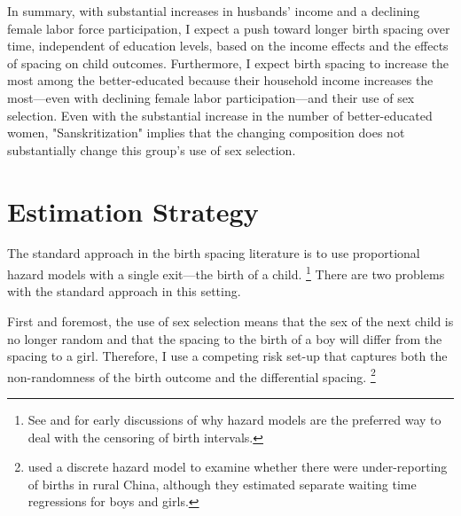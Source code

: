 \documentclass[12pt,letterpaper]{article}
\begin{document}
In summary, with substantial increases in husbands' income and a declining female labor 
force participation, I expect a push toward longer birth spacing over time, independent
of education levels, based on the income effects and the effects of spacing
on child outcomes.
Furthermore, I expect birth spacing to increase the most among the better-educated 
because their household income increases the most---even with declining female labor 
participation---and their use of sex selection.
Even with the substantial increase in the number of better-educated women, 
"Sanskritization" implies that the changing composition does not substantially change 
this group's use of sex selection.



\section{Estimation Strategy\label{sec:strategy}}


The standard approach in the birth spacing literature is to use proportional hazard
models with a single exit---the birth of a child.%
\footnote{
See \citet{Sheps1970} and \citet{Newman1984} for early discussions of why 
hazard models are the preferred way to deal with the censoring of birth
intervals.
}
There are two problems with the standard approach in this setting.

First and foremost, the use of sex selection means that the sex of the next child is 
no longer random and that the spacing to the birth of a boy will differ from the 
spacing to a girl. 
Therefore, I use a competing risk set-up that captures both the non-randomness of 
the birth outcome and the differential spacing.%
\footnote{
\cite{Merli2000} used a discrete hazard model to examine whether 
there were under-reporting of births in rural China, although they 
estimated separate waiting time regressions for boys and girls.
}
\end{document}
